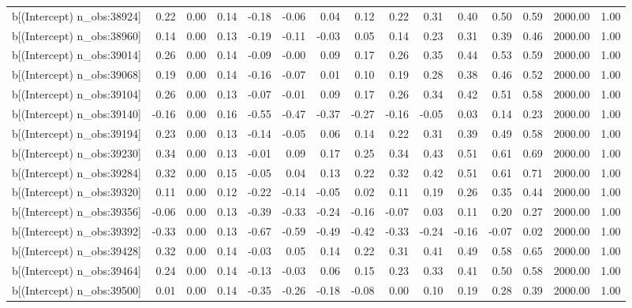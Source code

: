 \begin{table}[ht]
\begin{tabular}{rrrrrrrrrrrrrrr}
  b[(Intercept) n\_obs:38924] & 0.22 & 0.00 & 0.14 & -0.18 & -0.06 & 0.04 & 0.12 & 0.22 & 0.31 & 0.40 & 0.50 & 0.59 & 2000.00 & 1.00 \\ 
  b[(Intercept) n\_obs:38960] & 0.14 & 0.00 & 0.13 & -0.19 & -0.11 & -0.03 & 0.05 & 0.14 & 0.23 & 0.31 & 0.39 & 0.46 & 2000.00 & 1.00 \\ 
  b[(Intercept) n\_obs:39014] & 0.26 & 0.00 & 0.14 & -0.09 & -0.00 & 0.09 & 0.17 & 0.26 & 0.35 & 0.44 & 0.53 & 0.59 & 2000.00 & 1.00 \\ 
  b[(Intercept) n\_obs:39068] & 0.19 & 0.00 & 0.14 & -0.16 & -0.07 & 0.01 & 0.10 & 0.19 & 0.28 & 0.38 & 0.46 & 0.52 & 2000.00 & 1.00 \\ 
  b[(Intercept) n\_obs:39104] & 0.26 & 0.00 & 0.13 & -0.07 & -0.01 & 0.09 & 0.17 & 0.26 & 0.34 & 0.42 & 0.51 & 0.58 & 2000.00 & 1.00 \\ 
  b[(Intercept) n\_obs:39140] & -0.16 & 0.00 & 0.16 & -0.55 & -0.47 & -0.37 & -0.27 & -0.16 & -0.05 & 0.03 & 0.14 & 0.23 & 2000.00 & 1.00 \\ 
  b[(Intercept) n\_obs:39194] & 0.23 & 0.00 & 0.13 & -0.14 & -0.05 & 0.06 & 0.14 & 0.22 & 0.31 & 0.39 & 0.49 & 0.58 & 2000.00 & 1.00 \\ 
  b[(Intercept) n\_obs:39230] & 0.34 & 0.00 & 0.13 & -0.01 & 0.09 & 0.17 & 0.25 & 0.34 & 0.43 & 0.51 & 0.61 & 0.69 & 2000.00 & 1.00 \\ 
  b[(Intercept) n\_obs:39284] & 0.32 & 0.00 & 0.15 & -0.05 & 0.04 & 0.13 & 0.22 & 0.32 & 0.42 & 0.51 & 0.61 & 0.71 & 2000.00 & 1.00 \\ 
  b[(Intercept) n\_obs:39320] & 0.11 & 0.00 & 0.12 & -0.22 & -0.14 & -0.05 & 0.02 & 0.11 & 0.19 & 0.26 & 0.35 & 0.44 & 2000.00 & 1.00 \\ 
  b[(Intercept) n\_obs:39356] & -0.06 & 0.00 & 0.13 & -0.39 & -0.33 & -0.24 & -0.16 & -0.07 & 0.03 & 0.11 & 0.20 & 0.27 & 2000.00 & 1.00 \\ 
  b[(Intercept) n\_obs:39392] & -0.33 & 0.00 & 0.13 & -0.67 & -0.59 & -0.49 & -0.42 & -0.33 & -0.24 & -0.16 & -0.07 & 0.02 & 2000.00 & 1.00 \\ 
  b[(Intercept) n\_obs:39428] & 0.32 & 0.00 & 0.14 & -0.03 & 0.05 & 0.14 & 0.22 & 0.31 & 0.41 & 0.49 & 0.58 & 0.65 & 2000.00 & 1.00 \\ 
  b[(Intercept) n\_obs:39464] & 0.24 & 0.00 & 0.14 & -0.13 & -0.03 & 0.06 & 0.15 & 0.23 & 0.33 & 0.41 & 0.50 & 0.58 & 2000.00 & 1.00 \\ 
  b[(Intercept) n\_obs:39500] & 0.01 & 0.00 & 0.14 & -0.35 & -0.26 & -0.18 & -0.08 & 0.00 & 0.10 & 0.19 & 0.28 & 0.39 & 2000.00 & 1.00 \\ 

\end{tabular}
\end{table}
